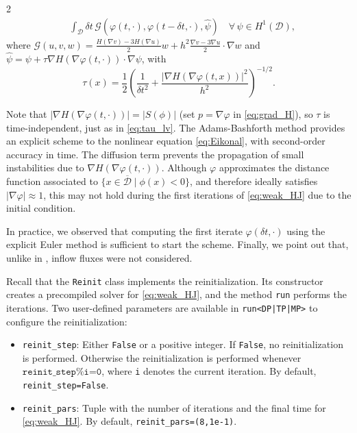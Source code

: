 \documentclass[a4paper, oneside]{article}
\newcommand{\tred}{\textcolor{red}}
\newcommand{\tblue}{\textcolor{blue}}
\newcommand{\code}[1]{\texttt{#1}}
\begin{document}
\begin{multicols}{2}
\begin{align}
	& \int_{\mathcal{D}} {\delta t}\,\mathcal{G}(\varphi(t, \cdot), \varphi(t - \delta t, \cdot), \hat{\psi}) \quad \forall \, \psi\in H^1(\mathcal{D}),
\end{align}
where $\mathcal{G}(u, v, w) = \tfrac{H(\nabla v)-3H(\nabla u)}{2} w + h^2 \tfrac{\nabla v - 3\nabla u}{2} \cdot \nabla w$
and $\hat{\psi}=\psi+\tau\nabla H(\nabla \varphi(t, \cdot)) \cdot\nabla\psi $, with 
\begin{equation}
	\tau(x) = \frac{1}{2}\left(\frac{1}{\delta t^2}  + \frac{|\nabla H(\nabla \varphi(t, x))|^2}{h^2}\right)^{-1/2}.
\end{equation}

Note that $|\nabla H(\nabla \varphi(t, \cdot))| = \left|S(\phi)\right|$ (set $p=\nabla \varphi$ in \eqref{eq:grad_H}),
so $\tau$ is time-independent, just as in \eqref{eq:tau_lv}.
The Adams-Bashforth method provides an explicit scheme
to the nonlinear equation \eqref{eq:Eikonal},
with second-order accuracy in time.
The diffusion term prevents the propagation of
small instabilities due to $\nabla H(\nabla \varphi (t, \cdot))$.
Although $\varphi$ approximates the distance function
associated to $\{x\in\overline{\mathcal{D}} \mid \phi(x)<0\}$, and
therefore ideally satisfies $\left|\nabla \varphi\right| \approx 1$,
this may not hold during the first iterations of \eqref{eq:weak_HJ}
due to the initial condition.

In practice, we observed that computing
the first iterate $\varphi(\delta t, \cdot)$
using the explicit Euler method is sufficient to start the scheme.
Finally, we point out that, unlike in \cite{MR1640142}, inflow fluxes were not considered.

Recall that the \code{Reinit} class implements the reinitialization.
Its constructor creates a precompiled solver for \eqref{eq:weak_HJ},
and the method \code{run} performs the iterations.
Two user-defined parameters are available in \code{run<DP|TP|MP>}
to configure the reinitialization:
\begin{itemize}[left=0.0em]
	\item \code{reinit\_step}:
	Either \code{False} or a positive integer.
	If \code{False}, no reinitialization is performed. Otherwise
	the reinitialization is performed whenever $\code{reinit\_step\%i=0}$, where
	\code{i} denotes the current iteration. By default, \code{reinit\_step=False}.
	\item \code{reinit\_pars}:
	Tuple with the number of iterations and the final time for \eqref{eq:weak_HJ}.
	By default, \code{reinit\_pars=(8,1e-1)}.
\end{itemize}


\end{multicols}
\end{document}

